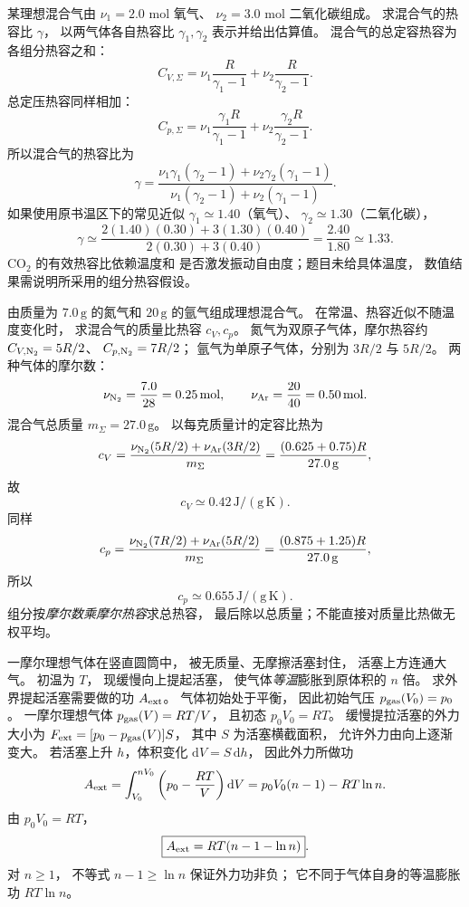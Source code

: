 某理想混合气由
$\nu_1=2.0$ mol 氧气、
$\nu_2=3.0$ mol 二氧化碳组成。
求混合气的热容比 $\gamma$，
以两气体各自热容比
$\gamma_1,\gamma_2$ 表示并给出估算值。
\exsolution
混合气的总定容热容为各组分热容之和：
\[
C_{V,\Sigma}=
\nu_1\frac R{\gamma_1-1}
+\nu_2\frac R{\gamma_2-1}.
\]
总定压热容同样相加：
\[
C_{p,\Sigma}=
\nu_1\frac{\gamma_1 R}{\gamma_1-1}
+\nu_2\frac{\gamma_2 R}{\gamma_2-1}.
\]
所以混合气的热容比为
\[
\boxed{\gamma=
\frac{\nu_1\gamma_1(\gamma_2-1)
+\nu_2\gamma_2(\gamma_1-1)}
{\nu_1(\gamma_2-1)+\nu_2(\gamma_1-1)}}.
\]
如果使用原书温区下的常见近似
$\gamma_1\simeq1.40$（氧气）、
$\gamma_2\simeq1.30$（二氧化碳），
\[
\boxed{\gamma\simeq
\frac{2(1.40)(0.30)+3(1.30)(0.40)}
{2(0.30)+3(0.40)}
=\frac{2.40}{1.80}\simeq1.33}.
\]
\excheck CO$_2$ 的有效热容比依赖温度和
是否激发振动自由度；题目未给具体温度，
数值结果需说明所采用的组分热容假设。

由质量为 $7.0\,\mathrm g$ 的氮气和
$20\,\mathrm g$ 的氩气组成理想混合气。
在常温、热容近似不随温度变化时，
求混合气的质量比热容
$c_V,c_p$。
\exsolution
氮气为双原子气体，摩尔热容约
$C_{V,{\rm N_2}}=5R/2$、
$C_{p,{\rm N_2}}=7R/2$；
氩气为单原子气体，分别为
$3R/2$ 与 $5R/2$。
两种气体的摩尔数：
\[
\nu_{\rm N_2}=\frac{7.0}{28}=0.25\,\mathrm{mol},
\qquad
\nu_{\rm Ar}=\frac{20}{40}=0.50\,\mathrm{mol}.
\]
混合气总质量 $m_{\Sigma}=27.0\,\mathrm g$。
以每克质量计的定容比热为
\[
c_V=
\frac{\nu_{\rm N_2}(5R/2)+\nu_{\rm Ar}(3R/2)}
{m_{\Sigma}}
=\frac{(0.625+0.75)R}{27.0\,\mathrm g},
\]
故
\[
\boxed{c_V\simeq0.42\,\mathrm{J/(g\,K)}}.
\]
同样
\[
c_p=
\frac{\nu_{\rm N_2}(7R/2)+\nu_{\rm Ar}(5R/2)}
{m_{\Sigma}}
=\frac{(0.875+1.25)R}{27.0\,\mathrm g},
\]
所以
\[
\boxed{c_p\simeq0.655\,\mathrm{J/(g\,K)}}.
\]
\excheck 组分按\emph{摩尔数乘摩尔热容}求总热容，
最后除以总质量；不能直接对质量比热做无权平均。

一摩尔理想气体在竖直圆筒中，
被无质量、无摩擦活塞封住，
活塞上方连通大气。
初温为 $T$，
现缓慢向上提起活塞，
使气体\emph{等温}膨胀到原体积的
$n$ 倍。
求外界提起活塞需要做的功 $A_{\rm ext}$。
\exsolution
气体初始处于平衡，
因此初始气压
$p_{\rm gas}(V_0)=p_0$。
一摩尔理想气体
$p_{\rm gas}(V)=RT/V$，
且初态 $p_0V_0=RT$。
缓慢提拉活塞的外力大小为
$F_{\rm ext}=[p_0-p_{\rm gas}(V)]S$，
其中 $S$ 为活塞横截面积，
允许外力由向上逐渐变大。
若活塞上升 $h$，体积变化
$\mathrm dV=S\,\mathrm dh$，
因此外力所做功
\[
A_{\rm ext}
=\int_{V_0}^{nV_0}
\left(p_0-\frac{RT}{V}\right)\mathrm dV
=p_0V_0(n-1)-RT\ln n.
\]
由 $p_0V_0=RT$，
\[
\boxed{A_{\rm ext}=RT(n-1-\ln n)}.
\]
\excheck 对 $n\ge1$，
不等式 $n-1\ge\ln n$ 保证外力功非负；
它不同于气体自身的等温膨胀功 $RT\ln n$。
